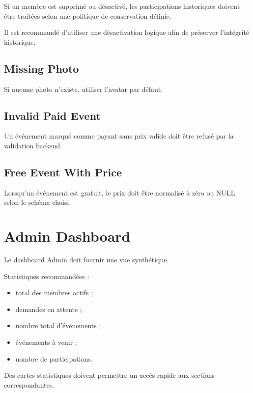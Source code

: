 \documentclass[11pt,a4paper]{report}
\begin{document}
Si un membre est supprimé ou désactivé, les participations historiques doivent être traitées selon une politique de conservation définie.

Il est recommandé d'utiliser une désactivation logique afin de préserver l'intégrité historique.

\section{Missing Photo}

Si aucune photo n'existe, utiliser l'avatar par défaut.

\section{Invalid Paid Event}

Un événement marqué comme payant sans prix valide doit être refusé par la validation backend.

\section{Free Event With Price}

Lorsqu'un événement est gratuit, le prix doit être normalisé à zéro ou NULL selon le schéma choisi.

\chapter{Admin Dashboard}

Le dashboard Admin doit fournir une vue synthétique.

Statistiques recommandées :

\begin{itemize}
    \item total des membres actifs ;
    \item demandes en attente ;
    \item nombre total d'événements ;
    \item événements à venir ;
    \item nombre de participations.
\end{itemize}

Des cartes statistiques doivent permettre un accès rapide aux sections correspondantes.

\end{document}
